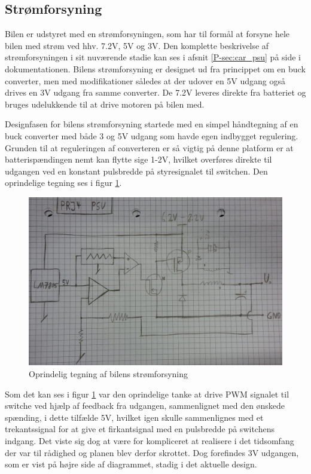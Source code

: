 \subsection{Strømforsyning}\label{sec:hwd_psu}

Bilen er udstyret med en strømforsyningen, som har til formål at forsyne hele bilen med strøm ved hhv. 7.2V, 5V og 3V. 
Den komplette beskrivelse af strømforsyningen i sit nuværende stadie kan ses i afsnit \ref{P-sec:car_psu}  på side \pageref{P-sec:car_psu} i dokumentationen.
Bilens strømforsyning er designet ud fra princippet om en buck converter\cite[s. 326] {lib:analogteknik}, men med modifikationer således at der udover en 5V udgang også drives en 3V udgang fra samme converter.
De 7.2V leveres direkte fra batteriet og bruges udelukkende til at drive motoren på bilen med.

Designfasen for bilens strømforsyning startede med en simpel håndtegning af en buck converter med både 3 og 5V udgang som havde egen indbygget regulering. 
Grunden til at reguleringen af converteren er så vigtig på denne platform er at batterispændingen nemt kan flytte sige 1-2V, hvilket overføres direkte til udgangen ved en konstant pulsbredde på styresignalet til switchen. Den oprindelige tegning ses i figur \ref{fig:bil_psu_sketch}.

\begin{figure}[h]
\centering
\includegraphics[width=\textwidth]{../fig/diagrammer/bil/psu_sketch}
\caption{Oprindelig tegning af bilens strømforsyning}
\label{fig:bil_psu_sketch}
\end{figure}

Som det kan ses i figur \ref{fig:bil_psu_sketch} var den oprindelige tanke at drive PWM signalet til switche ved hjælp af feedback fra udgangen, sammenlignet med den ønskede spænding, i dette tilfælde 5V, hvilket igen skulle sammenlignes med et trekantssignal for at give et firkantsignal med en pulsbredde på switchens indgang.
Det viste sig dog at være for kompliceret at realisere i det tidsomfang der var til rådighed og planen blev derfor skrottet.
Dog forefindes 3V udgangen, som er vist på højre side af diagrammet, stadig i det aktuelle design.

